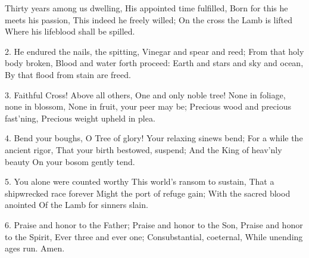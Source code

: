 Thirty years among us dwelling,
His appointed time fulfilled,
Born for this he meets his passion,
This indeed he freely willed;
On the cross the Lamb is lifted
Where his lifeblood shall be spilled.

2. He endured the nails, the spitting,
Vinegar and spear and reed;
From that holy body broken,
Blood and water forth proceed:
Earth and stars and sky and ocean,
By that flood from stain are freed.

3. Faithful Cross! Above all others,
One and only noble tree!
None in foliage, none in blossom,
None in fruit, your peer may be;
Precious wood and precious fast'ning,
Precious weight upheld in plea.

4. Bend your boughs, O Tree of glory!
Your relaxing sinews bend;
For a while the ancient rigor,
That your birth bestowed, suspend;
And the King of heav'nly beauty
On your bosom gently tend.

5. You alone were counted worthy
This world's ransom to sustain,
That a shipwrecked race forever
Might the port of refuge gain;
With the sacred blood anointed
Of the Lamb for sinners slain.

6. Praise and honor to the Father;
Praise and honor to the Son,
Praise and honor to the Spirit,
Ever three and ever one;
Consubstantial, coeternal,
While unending ages run.
Amen.